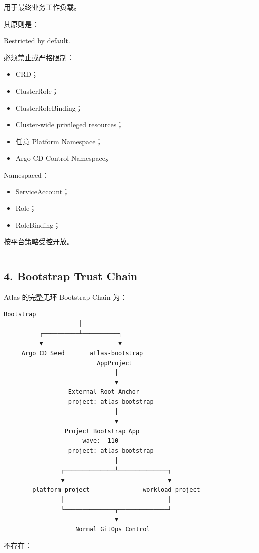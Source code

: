 \documentclass[11pt,a4paper]{article}
\begin{document}
用于最终业务工作负载。

其原则是：

\begin{gfmBlockquote}
Restricted by default.
\end{gfmBlockquote}
必须禁止或严格限制：

\begin{itemize}
  \item CRD；
  \item ClusterRole；
  \item ClusterRoleBinding；
  \item Cluster-wide privileged resources；
  \item 任意 Platform Namespace；
  \item Argo CD Control Namespace。
\end{itemize}
Namespaced：

\begin{itemize}
  \item ServiceAccount；
  \item Role；
  \item RoleBinding；
\end{itemize}
按平台策略受控开放。

\vspace{0.5em}\hrule\vspace{0.5em}
\subsection{4. Bootstrap Trust Chain}
Atlas 的完整无环 Bootstrap Chain 为：

\begin{lstlisting}[language=text]
                 Bootstrap
                     │
          ┌──────────┴──────────┐
          ▼                     ▼
     Argo CD Seed       atlas-bootstrap
                          AppProject
                               │
                               ▼
                  External Root Anchor
                  project: atlas-bootstrap
                               │
                               ▼
                 Project Bootstrap App
                      wave: -110
                  project: atlas-bootstrap
                               │
                ┌──────────────┴──────────────┐
                ▼                             ▼
        platform-project               workload-project
                │                             │
                └──────────────┬──────────────┘
                               ▼
                    Normal GitOps Control
\end{lstlisting}
不存在：
\end{document}
